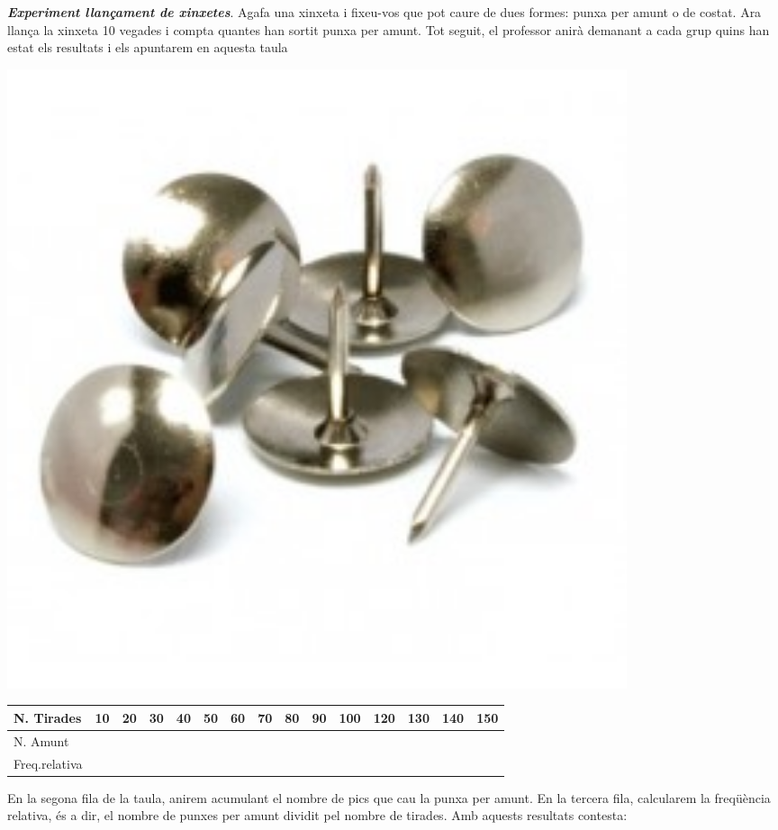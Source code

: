 \begin{mylist}
\pagebreak
 
 \mbox{}
\vspace*{-2.5cm}
\exer \simbolsearch \begin{minipage}[t]{0.7\textwidth}  \textit{\bf Experiment llançament de xinxetes}. Agafa una xinxeta i fixeu-vos que pot caure de dues formes: punxa per amunt o de costat. Ara llança la xinxeta 10 vegades i compta quantes han sortit punxa per amunt. Tot seguit, el professor anirà demanant a cada grup quins han estat els resultats i els apuntarem en aquesta taula
	\end{minipage}
\begin{minipage}{0.3\textwidth}
\vspace{2cm}
\centering
\includegraphics[width=0.8\textwidth]{img-04/xinxetes}
\end{minipage}

\begin{longtable}{|p{0.7in}|p{0.2in}|p{0.2in}|p{0.2in}|p{0.2in}|p{0.2in}|p{0.2in}|p{0.2in}|p{0.2in}|p{0.2in}|p{0.2in}|p{0.2in}|p{0.2in}|p{0.2in}|p{0.2in}|} \hline 
	N. Tirades & 10 & 20 & 30 & 40 & 50 & 60 & 70 & 80 & 90 & 100 & 120 & 130 & 140 & 150 \\ \hline 
	N. Amunt &  &  &  &  &  &  &  &  &  &  &  &  &  &  \\ \hline 
	Freq.\newline relativa &  &  &  &  &  &  &  &  &  &  &  &  &  &  \\ \hline 
\end{longtable}

En la segona fila de la taula, anirem acumulant el nombre de pics que cau la punxa per amunt. En la tercera fila, calcularem la freqüència relativa, és a dir, el nombre de punxes per amunt dividit pel nombre de tirades. Amb aquests resultats contesta:


\end{mylist}
